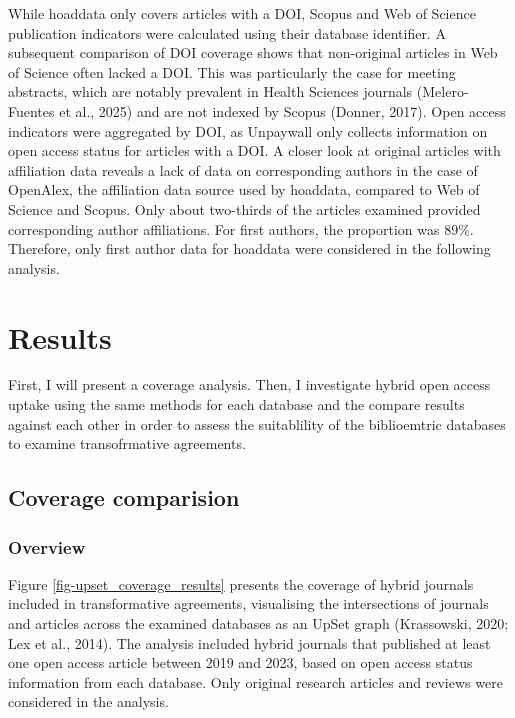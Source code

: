 \documentclass[a4paper,man,floatsintext,longtable,noextraspace,10pt]{apa6}
\begin{document}
While hoaddata only covers articles with a DOI, Scopus and Web of
Science publication indicators were calculated using their database
identifier. A subsequent comparison of DOI coverage shows that
non-original articles in Web of Science often lacked a DOI. This was
particularly the case for meeting abstracts, which are notably prevalent
in Health Sciences journals (Melero-Fuentes et al., 2025) and are not
indexed by Scopus (Donner, 2017). Open access indicators were aggregated
by DOI, as Unpaywall only collects information on open access status for
articles with a DOI. A closer look at original articles with affiliation
data reveals a lack of data on corresponding authors in the case of
OpenAlex, the affiliation data source used by hoaddata, compared to Web
of Science and Scopus. Only about two-thirds of the articles examined
provided corresponding author affiliations. For first authors, the
proportion was 89\%. Therefore, only first author data for hoaddata were
considered in the following analysis.

\section{Results}\label{results}

First, I will present a coverage analysis. Then, I investigate hybrid
open access uptake using the same methods for each database and the
compare results against each other in order to assess the suitablility
of the biblioemtric databases to examine transofrmative agreements.

\subsection{Coverage comparision}\label{coverage-comparision}

\subsubsection{Overview}\label{overview}

Figure \ref{fig-upset_coverage_results} presents the coverage of hybrid
journals included in transformative agreements, visualising the
intersections of journals and articles across the examined databases as
an UpSet graph (Krassowski, 2020; Lex et al., 2014). The analysis
included hybrid journals that published at least one open access article
between 2019 and 2023, based on open access status information from each
database. Only original research articles and reviews were considered in
the analysis.
\end{document}
